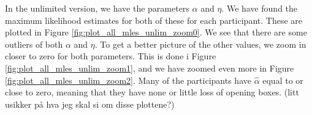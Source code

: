 In the unlimited version, we have the parameters $\alpha$ and $\eta$. We have found the maximum likelihood estimates for both of these for each participant. These are plotted in Figure \ref{fig:plot_all_mles_unlim_zoom0}. We see that there are some outliers of both $\alpha$ and $\eta$. To get a better picture of the other values, we zoom in closer to zero for both parameters. This is done i Figure \ref{fig:plot_all_mles_unlim_zoom1}, and we have zoomed even more in Figure \ref{fig:plot_all_mles_unlim_zoom2}. Many of the participants have $\hat{\alpha}$ equal to or close to zero, meaning that they have none or little loss of opening boxes. 
(litt usikker på hva jeg skal si om disse plottene?)

